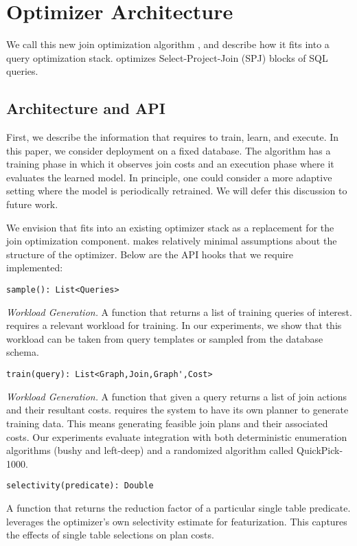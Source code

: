 \section{Optimizer Architecture}
We call this new join optimization algorithm \sys, and describe how it fits into a query optimization stack. \sys optimizes Select-Project-Join (SPJ) blocks of SQL queries.

\subsection{Architecture and API}
First, we describe the information that \sys requires to train, learn, and execute.
In this paper, we consider deployment on a fixed database.
The algorithm has a training phase in which it observes join costs and an execution phase where it evaluates the learned model.
In principle, one could consider a more adaptive setting where the model is periodically retrained. We will defer this discussion to future work.

We envision that \sys fits into an existing optimizer stack as a replacement for the join optimization component.
\sys makes relatively minimal assumptions about the structure of the optimizer. Below are the API hooks that we require implemented:

\vspace{0.5em}
\begin{lstlisting}
sample(): List<Queries> 
\end{lstlisting}
\noindent \emph{Workload Generation.} A function that returns a list of training queries of interest. \sys requires a relevant workload for training. In our experiments, we show that this workload can be taken from query templates or sampled from the database schema.


\vspace{0.5em}
\begin{lstlisting}
train(query): List<Graph,Join,Graph',Cost> 
\end{lstlisting}
\noindent \emph{Workload Generation.} A function that given a query returns a list of join actions and their resultant costs. \sys requires the system to have its own planner to generate training data. This means generating feasible join plans and their associated costs. Our experiments evaluate integration with both deterministic enumeration algorithms (bushy and left-deep) and a randomized algorithm called QuickPick-1000.


\vspace{0.5em}
\begin{lstlisting}
selectivity(predicate): Double
\end{lstlisting}
\noindent A function that returns the reduction factor of a particular single table predicate. \sys leverages the optimizer's own selectivity estimate for featurization. This captures the effects of single table selections on plan costs.


